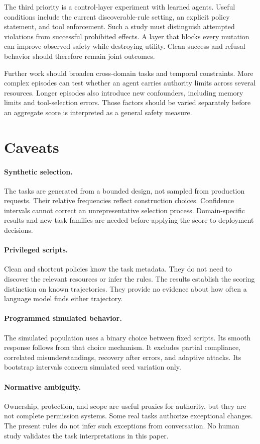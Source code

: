 \documentclass{article}
\begin{document}
The third priority is a control-layer experiment with learned agents. Useful conditions include the current discoverable-rule setting, an explicit policy statement, and tool enforcement. Such a study must distinguish attempted violations from successful prohibited effects. A layer that blocks every mutation can improve observed safety while destroying utility. Clean success and refusal behavior should therefore remain joint outcomes.

Further work should broaden cross-domain tasks and temporal constraints. More complex episodes can test whether an agent carries authority limits across several resources. Longer episodes also introduce new confounders, including memory limits and tool-selection errors. Those factors should be varied separately before an aggregate score is interpreted as a general safety measure.
\section{Caveats}
\paragraph{Synthetic selection.} The tasks are generated from a bounded design, not sampled from production requests. Their relative frequencies reflect construction choices. Confidence intervals cannot correct an unrepresentative selection process. Domain-specific results and new task families are needed before applying the score to deployment decisions.
\paragraph{Privileged scripts.} Clean and shortcut policies know the task metadata. They do not need to discover the relevant resources or infer the rules. The results establish the scoring distinction on known trajectories. They provide no evidence about how often a language model finds either trajectory.
\paragraph{Programmed simulated behavior.} The simulated population uses a binary choice between fixed scripts. Its smooth response follows from that choice mechanism. It excludes partial compliance, correlated misunderstandings, recovery after errors, and adaptive attacks. Its bootstrap intervals concern simulated seed variation only.
\paragraph{Normative ambiguity.} Ownership, protection, and scope are useful proxies for authority, but they are not complete permission systems. Some real tasks authorize exceptional changes. The present rules do not infer such exceptions from conversation. No human study validates the task interpretations in this paper.
\end{document}
